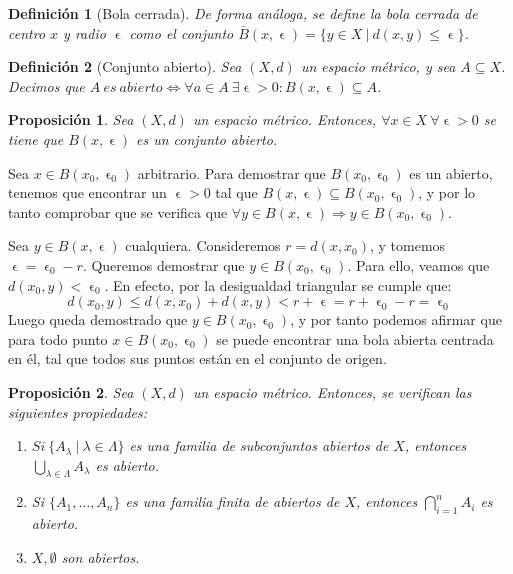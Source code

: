 \documentclass[11pt, a4paper, titlepage]{article}
\makeatletter
\let\epsilon\upvarepsilon
\renewenvironment{proof}[1][\proofname] {\vspace{-15pt}\par\pushQED{\qed}\normalfont\topsep6\p@\@plus6\p@\relax\trivlist\item[\hskip\labelsep\it#1\@addpunct{.}]\ignorespaces}{\popQED\endtrivlist\@endpefalse}
\theoremstyle{theorem-style}
\newtheorem*{nprop}{Proposición}
\theoremstyle{definition-style}
\newtheorem*{ndef}{Definición}
\theoremstyle{remark-style}
\theoremstyle{example-style}
\newenvironment{nlist}
{\begin{enumerate}
\renewcommand\labelenumi{(\emph{\roman{enumi})}}}
{\end{enumerate}}
\makeatother
\begin{document}
\begin{ndef}[Bola cerrada]
De forma análoga, se define la \emph{bola cerrada de centro $x$ y radio $\epsilon$} como el conjunto $\bar{B}(x,\epsilon) = \{y\in X \ | \ d(x,y)\leq \epsilon \}$.
\end{ndef}



\begin{ndef}[Conjunto abierto]
Sea $(X,d)$ un espacio métrico, y sea $A\subseteq X$. Decimos que \mbox{$A\ es\ abierto \iff \forall a \in A\ \exists \epsilon > 0: B(x,\epsilon) \subseteq A$}.	
\end{ndef}



\begin{nprop}
Sea $(X,d)$ un espacio métrico. Entonces, $\forall x \in X \ \forall \epsilon > 0$ se tiene que $B(x,\epsilon)$ es un conjunto abierto.
\end{nprop}

\begin{proof}

Sea $x \in B(x_0,\epsilon_0) $ arbitrario. Para demostrar que $B(x_0,\epsilon_0)$ es un abierto, tenemos que encontrar un $\epsilon > 0$ tal que $B(x,\epsilon) \subseteq B(x_0,\epsilon_0)  $, y por lo tanto comprobar que se verifica que $\forall y \in B(x,\epsilon) \Rightarrow y \in B(x_0,\epsilon_0).$

Sea $y \in B(x, \epsilon )$ cualquiera. Consideremos $r = d(x, x_0)$, y tomemos $\epsilon = \epsilon_0 - r$. Queremos demostrar que $y \in B(x_0, \epsilon_0)$. Para ello, veamos que $d(x_0, y) < \epsilon_0$. En efecto, por la desigualdad triangular se cumple que: $$d(x_0, y) \leq d(x,x_0) + d(x,y) < r + \epsilon = r + \epsilon_0 - r = \epsilon_0 $$
Luego queda demostrado que $y \in B(x_0, \epsilon_0)$, y por tanto podemos afirmar que para todo punto $x \in B(x_0, \epsilon_0)$ se puede encontrar una bola abierta centrada en él, tal que todos sus puntos están en el conjunto de origen.
\end{proof}



\begin{nprop}
Sea $(X,d)$ un espacio métrico. Entonces, se verifican las siguientes propiedades:

\begin{nlist}
\item $Si\ \{A_\lambda \ | \ \lambda \in \Lambda \}$ es una familia de subconjuntos abiertos de $X$, entonces $\displaystyle \bigcup_{\lambda \in \Lambda} A_\lambda$ es abierto.

\item Si $\{A_1,\dots, A_n\}$ es una familia finita de abiertos de $X$, entonces $\displaystyle \bigcap_{i=1}^n A_i$ es abierto.

\item $X,\emptyset$ son abiertos.
\end{nlist}

\end{nprop}
\end{document}
